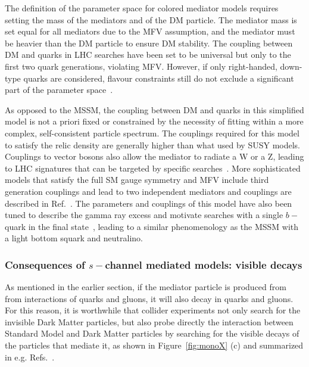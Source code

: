 The definition of the parameter space for colored mediator models requires setting the mass of the mediators and of the DM particle. The mediator mass is set equal for all mediators due to the MFV assumption, and the mediator must be heavier than the DM particle to ensure DM stability. 
The coupling between DM and quarks \gdmq in LHC searches have been set to be universal but only to the first two quark generations, violating MFV. 
However, if only right-handed, down-type quarks are considered, flavour constraints still do not exclude a significant part of the parameter space~\cite{Abercrombie:2015wmb}. 

As opposed to the MSSM, the coupling between DM and quarks in this simplified model is not a priori fixed or constrained by the necessity of fitting within a more complex, self-consistent particle spectrum. The couplings required for this model to satisfy the relic density are generally higher than what used by SUSY models. 
Couplings to vector bosons also allow the mediator to radiate a W or a Z, leading to LHC signatures that can be targeted by specific searches~\cite{Bell:2012rg}. 
More sophisticated models that satisfy the full SM gauge symmetry and MFV include third generation couplings and lead to two independent mediators and couplings are described in Ref.~\cite{Ko:2016zxg}. 
The parameters and couplings of this model have also been tuned to describe the gamma ray excess and motivate searches with a single $b-$quark in the final state~\cite{Agrawal:2014una}, leading to a similar phenomenology as the MSSM with a light bottom squark and neutralino. 

\subsubsection{Consequences of $s-$channel mediated models: visible decays}
\label{sec:MediatorSearches}

As mentioned in the earlier section, if the mediator particle is produced from from interactions of
quarks and gluons, it will also decay in quarks and gluons. 
For this reason, it is worthwhile that collider experiments not only search for
the invisible Dark Matter particles, but also probe directly the interaction between Standard Model and 
Dark Matter particles by searching for the visible decays of the particles that mediate it, as shown 
in Figure~\ref{fig:monoX} (c) and summarized in e.g. Refs.~\cite{Liew:2016oon,Fairbairn:2016iuf}. 

